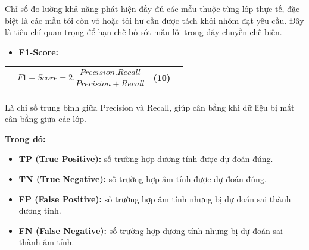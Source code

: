 \documentclass[
]{article}
\newcounter{none} %
\begin{document}
Chỉ số đo lường khả năng phát hiện đầy đủ các mẫu thuộc từng lớp thực tế,
đặc biệt là các mẫu tỏi còn vỏ hoặc tỏi hư cần được tách khỏi nhóm đạt
yêu cầu. Đây là tiêu chí quan trọng để hạn chế bỏ sót mẫu lỗi trong dây
chuyền chế biến.

\begin{itemize}
\item
  \textbf{F1-Score:}
\end{itemize}

{\def\LTcaptype{none} %
\begin{longtable}[]{@{}
  >{\raggedright\arraybackslash}p{}
  >{\raggedright\arraybackslash}p{}
  >{\raggedright\arraybackslash}p{}
  >{\raggedright\arraybackslash}p{}@{}}
\toprule\noalign{}
\begin{minipage}[b]{\linewidth}\raggedright
\end{minipage} & \begin{minipage}[b]{\linewidth}\centering
\[F1 - Score = 2.\frac{Precision.Recall}{Precision + Recall}\]
\end{minipage} & \begin{minipage}[b]{\linewidth}\raggedright
(10)
\end{minipage} & \begin{minipage}[b]{\linewidth}\raggedright
\end{minipage} \\
\midrule\noalign{}
\endhead
\bottomrule\noalign{}
\endlastfoot
\end{longtable}
}

Là chỉ số trung bình giữa Precision và Recall, giúp cân bằng khi dữ liệu
bị mất cân bằng giữa các lớp.

\textbf{Trong đó:}

\begin{itemize}
\item
  \textbf{TP (True Positive):} số trường hợp dương tính được dự đoán
  đúng.
\item
  \textbf{TN (True Negative):} số trường hợp âm tính được dự đoán đúng.
\item
  \textbf{FP (False Positive):} số trường hợp âm tính nhưng bị dự đoán
  sai thành dương tính.
\item
  \textbf{FN (False Negative):} số trường hợp dương tính nhưng bị dự
  đoán sai thành âm tính.
\end{itemize}
\end{document}
